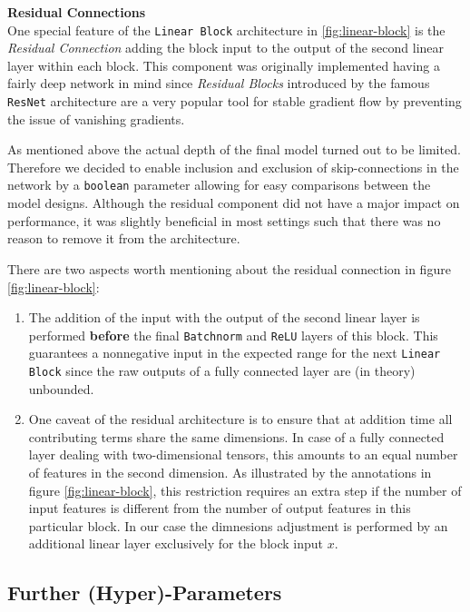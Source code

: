 \documentclass[12pt, letterpaper]{article}
\begin{document}
\textbf{Residual Connections} \\
One special feature of the \texttt{Linear Block} architecture in \ref{fig:linear-block} is the \emph{Residual Connection} adding the block input to the output of the second linear layer within each block.
This component was originally implemented having a fairly deep network in mind since \emph{Residual Blocks} introduced by the famous \texttt{ResNet} architecture are a very popular tool for stable gradient flow by preventing the issue of vanishing gradients.

As mentioned above the actual depth of the final model turned out to be limited.
Therefore we decided to enable inclusion and exclusion of skip-connections in the network by a \texttt{boolean} parameter allowing for easy comparisons between the model designs.
Although the residual component did not have a major impact on performance, it was slightly beneficial in most settings such that there was no reason to remove it from the architecture.

There are two aspects worth mentioning about the residual connection in figure \ref{fig:linear-block}:
\begin{enumerate}
    \item The addition of the input with the output of the second linear layer is performed \textbf{before} the final \texttt{Batchnorm} and \texttt{ReLU} layers of this block.
          This guarantees a nonnegative input in the expected range for the next \texttt{Linear Block} since the raw outputs of a fully connected layer are (in theory) unbounded.

    \item One caveat of the residual architecture is to ensure that at addition time all contributing terms share the same dimensions.
          In case of a fully connected layer dealing with two-dimensional tensors, this amounts to an equal number of features in the second dimension.
          As illustrated by the annotations in figure \ref{fig:linear-block}, this restriction requires an extra step if the number of input features is different from the number of output features in this particular block.
          In our case the dimnesions adjustment is performed by an additional linear layer exclusively for the block input $x$.
\end{enumerate}


\subsection{Further (Hyper)-Parameters}
\end{document}

